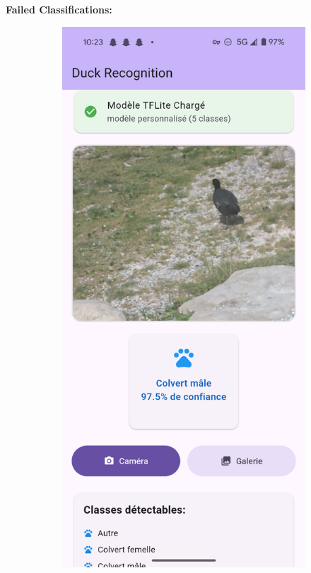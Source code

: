 \documentclass[12pt,a4paper]{article}
\begin{document}
\textbf{Failed Classifications:}

\begin{figure}[H]
    \centering
    \begin{subfigure}[b]{0.45\textwidth}
        \centering
        \includegraphics[width=\textwidth]{../../images/Results/Screenshot_20250615-102348.png}

\end{subfigure}
\end{figure}
\end{document}
